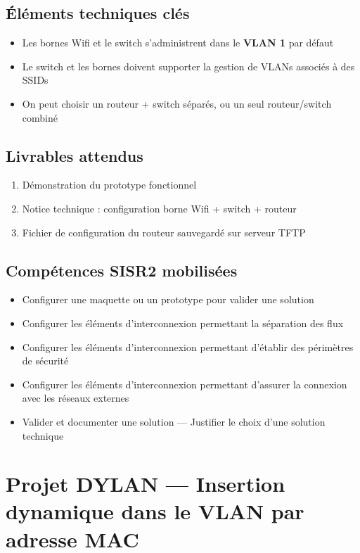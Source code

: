 \documentclass[a4paper,12pt]{article}
\begin{document}
\subsection{Éléments techniques clés}
\begin{itemize}[noitemsep]
    \item Les bornes Wifi et le switch s'administrent dans le \textbf{VLAN 1} par défaut
    \item Le switch et les bornes doivent supporter la gestion de VLANs associés à des SSIDs
    \item On peut choisir un routeur + switch séparés, ou un seul routeur/switch combiné
\end{itemize}

\subsection{Livrables attendus}
\begin{enumerate}[noitemsep]
    \item Démonstration du prototype fonctionnel
    \item Notice technique : configuration borne Wifi + switch + routeur
    \item Fichier de configuration du routeur sauvegardé sur serveur TFTP
\end{enumerate}

\subsection{Compétences SISR2 mobilisées}
\begin{itemize}[noitemsep]
    \item Configurer une maquette ou un prototype pour valider une solution
    \item Configurer les éléments d'interconnexion permettant la séparation des flux
    \item Configurer les éléments d'interconnexion permettant d'établir des périmètres de sécurité
    \item Configurer les éléments d'interconnexion permettant d'assurer la connexion avec les réseaux externes
    \item Valider et documenter une solution — Justifier le choix d'une solution technique
\end{itemize}

\section{Projet DYLAN — Insertion dynamique dans le VLAN par adresse MAC}
\end{document}
